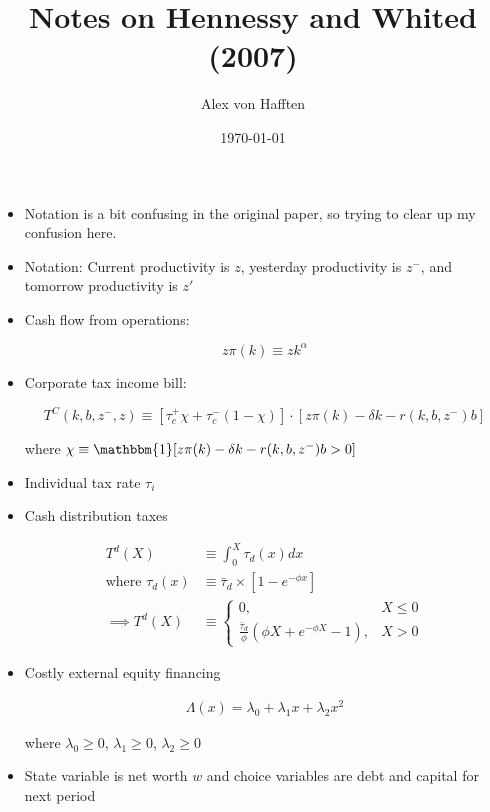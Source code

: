 \documentclass{article}
\title{Notes on Hennessy and Whited (2007)}
\author{Alex von Hafften}
\date{\today}
\newcommand{\one}{\mathbbm{1}}
\begin{document}
\maketitle

\begin{itemize}

\item Notation is a bit confusing in the original paper, so trying to clear up my confusion here.

\item Notation: Current productivity is $z$, yesterday productivity is $z^-$, and tomorrow productivity is $z'$

\item Cash flow from operations:

$$
z \pi(k) \equiv z k ^ \alpha
$$

\item Corporate tax income bill:

$$
T^C(k, b, z^-, z) \equiv [\tau_c^+ \chi + \tau_c^- ( 1 - \chi)] \cdot [z \pi (k) - \delta k - r(k, b, z^-) b]
$$

where  $\chi \equiv \one[z \pi (k) - \delta k - r(k, b, z^-) b > 0]$

\item Individual tax rate $\tau_i$

\item Cash distribution taxes

\begin{align*}
T^d(X) &\equiv \int_0^X \tau_d(x) dx \\
\text{where } 
\tau_d(x) &\equiv \bar \tau_d \times [1 - e^{-\phi x}] \\
\implies
T^d(X) &\equiv 
\begin{cases}
0,& X \le 0\\
\frac{\bar \tau_d}{\phi}(\phi X + e^{-\phi X} - 1), & X > 0
\end{cases}
\end{align*}

\item Costly external equity financing

\begin{align*}
\Lambda(x) = \lambda_0 +\lambda_1 x + \lambda_2 x^2
\end{align*}

where $\lambda_0 \ge 0$, $\lambda_1 \ge 0$, $\lambda_2 \ge 0$

\item State variable is net worth $w$ and choice variables are debt and capital for next period


\end{itemize}
\end{document}
